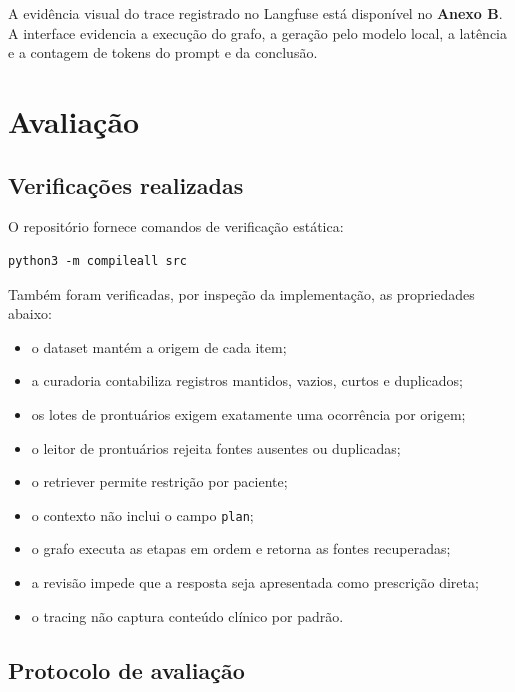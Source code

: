 \documentclass[12pt,a4paper]{article}
\begin{document}
A evidência visual do trace registrado no Langfuse está disponível no \textbf{Anexo B}. A interface evidencia a execução do grafo, a geração pelo modelo local, a latência e a contagem de tokens do prompt e da conclusão.

\section{Avaliação}

\subsection{Verificações realizadas}

O repositório fornece comandos de verificação estática:
\begin{verbatim}
python3 -m compileall src
\end{verbatim}

Também foram verificadas, por inspeção da implementação, as propriedades abaixo:
\begin{itemize}
  \item o dataset mantém a origem de cada item;
  \item a curadoria contabiliza registros mantidos, vazios, curtos e duplicados;
  \item os lotes de prontuários exigem exatamente uma ocorrência por origem;
  \item o leitor de prontuários rejeita fontes ausentes ou duplicadas;
  \item o retriever permite restrição por paciente;
  \item o contexto não inclui o campo \texttt{plan};
  \item o grafo executa as etapas em ordem e retorna as fontes recuperadas;
  \item a revisão impede que a resposta seja apresentada como prescrição direta;
  \item o tracing não captura conteúdo clínico por padrão.
\end{itemize}

\subsection{Protocolo de avaliação}
\end{document}

